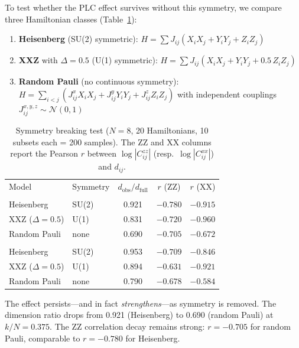 \documentclass[aps,pra,twocolumn,superscriptaddress]{revtex4-2}
\begin{document}
To test whether the PLC effect survives without this symmetry, we compare three Hamiltonian classes (Table~\ref{tab:symmetry}):

\begin{enumerate}
\item \textbf{Heisenberg} (SU(2) symmetric): $H = \sum J_{ij}(X_i X_j + Y_i Y_j + Z_i Z_j)$
\item \textbf{XXZ} with $\Delta = 0.5$ (U(1) symmetric): $H = \sum J_{ij}(X_i X_j + Y_i Y_j + 0.5\, Z_i Z_j)$
\item \textbf{Random Pauli} (no continuous symmetry): $H = \sum_{i<j} (J^x_{ij} X_i X_j + J^y_{ij} Y_i Y_j + J^z_{ij} Z_i Z_j)$ with independent couplings $J^{x,y,z}_{ij} \sim \mathcal{N}(0,1)$
\end{enumerate}

\begin{table}[t]
\caption{Symmetry breaking test ($N = 8$, 20 Hamiltonians, 10 subsets each = 200 samples). The ZZ and XX columns report the Pearson $r$ between $\log|C^{zz}_{ij}|$ (resp.\ $\log|C^{xx}_{ij}|$) and $d_{ij}$.}
\label{tab:symmetry}
\begin{ruledtabular}
\begin{tabular}{llccc}
Model & Symmetry & $d_\text{obs}/d_\text{full}$ & $r$ (ZZ) & $r$ (XX) \\
\colrule
\multicolumn{5}{c}{$k/N = 0.375$} \\
Heisenberg & SU(2) & 0.921 & $-0.780$ & $-0.915$ \\
XXZ ($\Delta{=}0.5$) & U(1) & 0.831 & $-0.720$ & $-0.960$ \\
Random Pauli & none & 0.690 & $-0.705$ & $-0.672$ \\
\colrule
\multicolumn{5}{c}{$k/N = 0.500$} \\
Heisenberg & SU(2) & 0.953 & $-0.709$ & $-0.846$ \\
XXZ ($\Delta{=}0.5$) & U(1) & 0.894 & $-0.631$ & $-0.921$ \\
Random Pauli & none & 0.790 & $-0.678$ & $-0.584$ \\
\end{tabular}
\end{ruledtabular}
\end{table}

The effect persists---and in fact \emph{strengthens}---as symmetry is removed. The dimension ratio drops from 0.921 (Heisenberg) to 0.690 (random Pauli) at $k/N = 0.375$. The ZZ correlation decay remains strong: $r = -0.705$ for random Pauli, comparable to $r = -0.780$ for Heisenberg.
\end{document}
